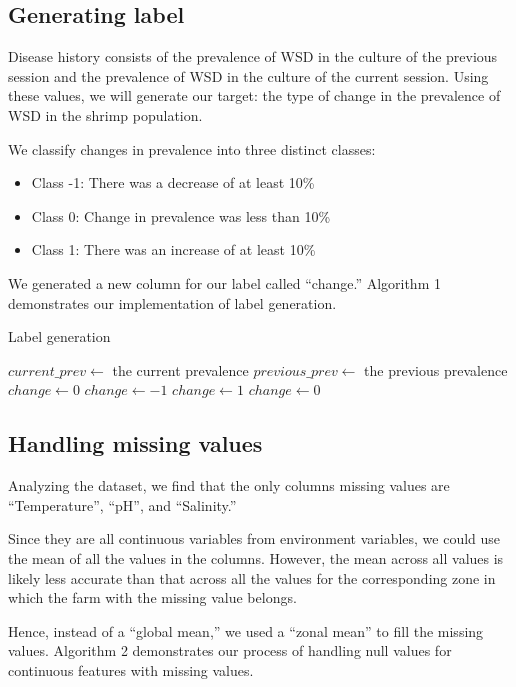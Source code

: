 \documentclass[journal,comsoc]{IEEEtran}
\begin{document}
\subsection{Generating label}
Disease history consists of the prevalence of WSD in the culture of the previous session and the prevalence of WSD in the culture of the current session. Using these values, we will generate our target: the type of change in the prevalence of WSD in the shrimp population.

We classify changes in prevalence into three distinct classes:
\begin{itemize}
  \item Class -1: There was a decrease of at least 10\%
  \item Class 0: Change in prevalence was less than 10\%
  \item Class 1: There was an increase of at least 10\%
\end{itemize}
We generated a new column for our label called “change.” Algorithm 1 demonstrates our implementation of label generation.

\begin{algorithm}[H]
\caption{Label generation}
\begin{algorithmic}
\State
\State $current\_prev \gets$ the current prevalence
\State $previous\_prev \gets$ the previous prevalence
\State $change \gets 0$
    \State $change \gets -1$
    \State $change \gets 1$
\Else
    \State $change \gets 0$
\EndIf
\State
\end{algorithmic}
\end{algorithm}

\subsection{Handling missing values}
Analyzing the dataset, we find that the only columns missing values are “Temperature”, “pH”, and “Salinity.” 

Since they are all continuous variables from environment variables, we could use the mean of all the values in the columns. However, the mean across all values is likely less accurate than that across all the values for the corresponding zone in which the farm with the missing value belongs.

Hence, instead of a “global mean,” we used a “zonal mean” to fill the missing values. Algorithm 2 demonstrates our process of handling null values for continuous features with missing values.
\end{document}
